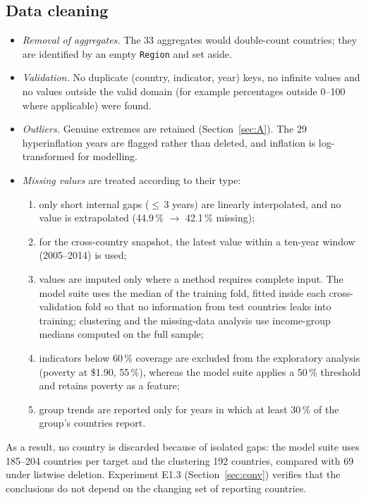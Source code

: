 \documentclass[11pt,a4paper]{article}
\newcommand{\var}[1]{\texttt{#1}}
\begin{document}
\subsection{Data cleaning}
\begin{itemize}
\item \emph{Removal of aggregates.} The 33 aggregates would double-count countries; they are identified by an empty \var{Region} and set aside.
\item \emph{Validation.} No duplicate (country, indicator, year) keys, no infinite values and no values outside the valid domain (for example percentages outside 0--100 where applicable) were found.
\item \emph{Outliers.} Genuine extremes are retained (Section~\ref{sec:A}). The 29 hyperinflation years are flagged rather than deleted, and inflation is log-transformed for modelling.
\item \emph{Missing values} are treated according to their type:
  \begin{enumerate}
  \item only short internal gaps ($\le$\,3 years) are linearly interpolated, and no value is extrapolated (44.9\,\% $\to$ 42.1\,\% missing);
  \item for the cross-country snapshot, the latest value within a ten-year window (2005--2014) is used;
  \item values are imputed only where a method requires complete input. The model suite uses the median of the training fold, fitted inside each cross-validation fold so that no information from test countries leaks into training; clustering and the missing-data analysis use income-group medians computed on the full sample;
  \item indicators below 60\,\% coverage are excluded from the exploratory analysis (poverty at \$1.90, 55\,\%), whereas the model suite applies a 50\,\% threshold and retains poverty as a feature;
  \item group trends are reported only for years in which at least 30\,\% of the group's countries report.
  \end{enumerate}
\end{itemize}
As a result, no country is discarded because of isolated gaps: the model suite uses 185--204 countries per target and the clustering 192 countries, compared with 69 under listwise deletion. Experiment E1.3 (Section~\ref{sec:conv}) verifies that the conclusions do not depend on the changing set of reporting countries.
\end{document}
